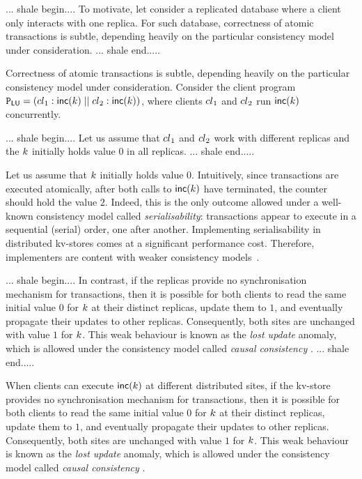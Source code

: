 ... shale begin....
To motivate, let consider a replicated database where
a client only interacts with one replica.
For such database,
correctness of atomic transactions is subtle, depending heavily on the
particular consistency model under consideration.  
... shale end.....

Correctness of atomic transactions is subtle, depending heavily on the
particular consistency model under consideration.  
Consider the client program
$\mathtt{P}_{\mathsf{LU}} = \left({cl}_1 : \mathsf{inc}(k) \;|| \; {cl}_2:
  \mathsf{inc}(k) \right)$, where clients ${cl}_1$ and ${cl}_2$ run
$\mathsf{inc}(k)$ concurrently.

... shale begin....
Let us assume that \( {cl}_1 \) and \( {cl}_2 \) work with different replicas and
the $k$ initially holds value $0$ in all replicas.
... shale end.....

Let us assume that  $k$ initially holds value $0$.
Intuitively, since transactions are executed atomically, after both
calls to $\mathsf{inc}(k)$ have terminated, the counter should hold 
the value $2$.
Indeed, this is the only outcome allowed under 
a well-known
consistency model called  \emph{serialisability}: transactions
appear to execute in a sequential (serial) order, one after another.
Implementing serialisability in distributed kv-stores comes at a
significant performance cost. Therefore, implementers are content with
{weaker} consistency models~\cite{.}. 


... shale begin....
In contrast, if the replicas provide no synchronisation mechanism for transactions,
then it is possible for both clients to read the same initial value $0$ for $k$ at their
distinct replicas, update them to $1$, and eventually propagate their updates to other replicas. 
Consequently, both
sites  are unchanged with value  $1$ for $k$.
This weak behaviour is known as the \emph{lost update} anomaly, which
is  allowed under the consistency model called {\em causal consistency} \cite{cops,wren,redblue}.
... shale end.....

When clients can execute $\mathsf{inc}(k)$ at different distributed
sites,
if the kv-store provides no synchronisation mechanism for transactions,
then it is possible for both clients to read the same initial value $0$ for $k$ at their
distinct replicas, update them to $1$, and eventually propagate their updates to other replicas.
Consequently, both
sites  are unchanged with value  $1$ for $k$.
This weak behaviour is known as the \emph{lost update} anomaly, which
is  allowed under the consistency model called {\em causal consistency} \cite{cops,wren,redblue}.


